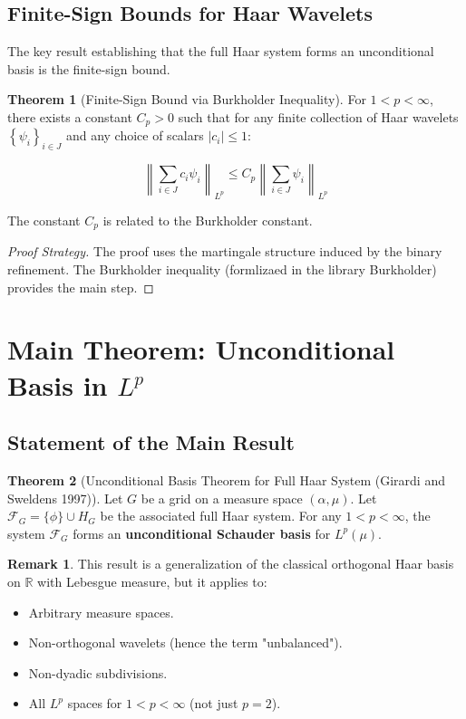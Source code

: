 \documentclass[12pt,a4paper]{article}
\theoremstyle{definition}
\newtheorem{theorem}{Theorem}[section]
\newtheorem{remark}{Remark}[section]
\newcommand{\Lp}[1]{L^{#1}}
\newcommand{\myset}[1]{\left\{#1\right\}}
\begin{document}
\subsection{Finite-Sign Bounds for Haar Wavelets}

The key result establishing that the full Haar system forms an unconditional basis is the finite-sign bound.

\begin{theorem}[Finite-Sign Bound via Burkholder Inequality]
For $1 < p < \infty$, there exists a constant $C_p > 0$ such that for any finite collection of Haar wavelets $\myset{\psi_i}_{i \in J}$ and any choice of scalars $|c_i| \leq 1$:

$$\left\|\sum_{i \in J} c_i \psi_i\right\|_{L^p} \leq C_p \left\|\sum_{i \in J} \psi_i\right\|_{L^p}$$

The constant $C_p$ is related to the Burkholder constant. 
\end{theorem}

\begin{proof}[Proof Strategy]
The proof uses the martingale structure induced by the binary refinement. The Burkholder inequality (formlizaed in the library Burkholder) provides the main step. 
\end{proof}

 

\newpage

\section{Main Theorem: Unconditional Basis in $\Lp{p}$}

\subsection{Statement of the Main Result}

\begin{theorem}[Unconditional Basis Theorem for Full Haar System (Girardi and  Sweldens 1997)]
Let $G$ be a  grid on a measure space $(\alpha, \mu)$.  Let $\mathcal{F}_G = \{\phi\} \cup H_G$ be the associated full Haar system. For any $1 < p < \infty$, the system $\mathcal{F}_G$ forms an \textbf{unconditional Schauder basis} for $\Lp{p}(\mu)$.     
\end{theorem}

\begin{remark}
This result is a generalization of the classical orthogonal Haar basis on $\mathbb{R}$ with Lebesgue measure, but it applies to:
\begin{itemize}
  \item Arbitrary measure spaces.
  \item Non-orthogonal wavelets (hence the term "unbalanced").
  \item Non-dyadic subdivisions.
  \item All $\Lp{p}$ spaces for $1 < p < \infty$ (not just $p = 2$).
\end{itemize}
\end{remark}
\end{document}

